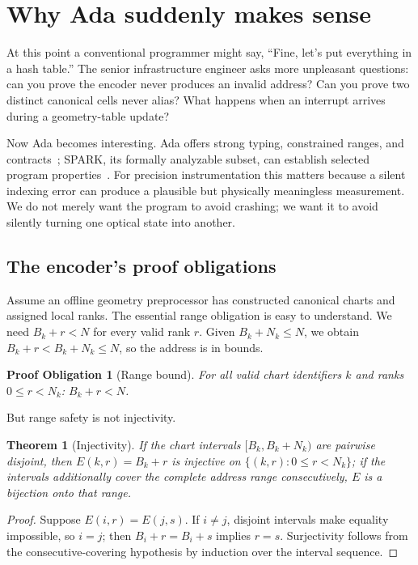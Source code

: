 \documentclass[11pt]{article}
\newtheorem{theorem}{Theorem}
\newtheorem{obligation}{Proof Obligation}
\begin{document}
\section{Why Ada suddenly makes sense}\label{sec:ada}

At this point a conventional programmer might say, ``Fine, let's put everything in a
hash table.'' The senior infrastructure engineer asks more unpleasant questions: can you
prove the encoder never produces an invalid address? Can you prove two distinct
canonical cells never alias? What happens when an interrupt arrives during a
geometry-table update?

Now Ada becomes interesting. Ada offers strong typing, constrained ranges, and
contracts~\cite{barnes2012}; SPARK, its formally analyzable subset, can establish
selected program properties~\cite{spark2014,mccormick2015}. For precision instrumentation this matters
because a silent indexing error can produce a plausible but physically meaningless
measurement. We do not merely want the program to avoid crashing; we want it to avoid
silently turning one optical state into another.

\subsection{The encoder's proof obligations}

Assume an offline geometry preprocessor has constructed canonical charts and assigned
local ranks. The essential range obligation is easy to understand. We need
$B_k + r < N$ for every valid rank $r$. Given $B_k + N_k \le N$, we obtain
$B_k + r < B_k + N_k \le N$, so the address is in bounds.

\begin{obligation}[Range bound]
For all valid chart identifiers $k$ and ranks $0 \le r < N_k$:
$B_k + r < N$.
\end{obligation}

But range safety is not injectivity.

\begin{theorem}[Injectivity]\label{thm:injective}
If the chart intervals $[B_k, B_k+N_k)$ are pairwise disjoint, then $E(k,r) = B_k + r$
is injective on $\{(k,r) : 0 \le r < N_k\}$; if the intervals additionally cover the
complete address range consecutively, $E$ is a bijection onto that range.
\end{theorem}
\begin{proof}
Suppose $E(i,r) = E(j,s)$. If $i \ne j$, disjoint intervals make equality impossible,
so $i=j$; then $B_i + r = B_i + s$ implies $r=s$. Surjectivity follows from the
consecutive-covering hypothesis by induction over the interval sequence.
\end{proof}
\end{document}
